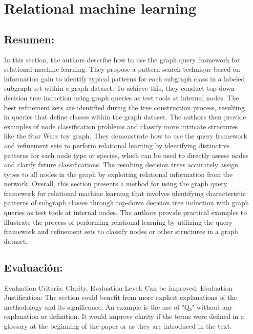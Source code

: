 \documentclass{article}%
\begin{document}
%
\clearpage%
\section{Relational machine learning}%
\label{sec:Relationalmachinelearning}%
\subsection{Resumen:}%
\label{subsec:Resumen}%
In this section, the authors describe how to use the graph query framework for relational machine learning. They propose a pattern search technique based on information gain to identify typical patterns for each subgraph class in a labeled subgraph set within a graph dataset. To achieve this, they conduct top{-}down decision tree induction using graph queries as test tools at internal nodes. The best refinement sets are identified during the tree construction process, resulting in queries that define classes within the graph dataset.\newline%
\newline%
The authors then provide examples of node classification problems and classify more intricate structures like the Star Wars toy graph. They demonstrate how to use the query framework and refinement sets to perform relational learning by identifying distinctive patterns for each node type or species, which can be used to directly assess nodes and clarify future classifications. The resulting decision trees accurately assign types to all nodes in the graph by exploiting relational information from the network.\newline%
\newline%
Overall, this section presents a method for using the graph query framework for relational machine learning that involves identifying characteristic patterns of subgraph classes through top{-}down decision tree induction with graph queries as test tools at internal nodes. The authors provide practical examples to illustrate the process of performing relational learning by utilizing the query framework and refinement sets to classify nodes or other structures in a graph dataset.

%
\subsection{Evaluación:}%
\label{subsec:Evaluacin}%
\newline%
Evaluation Criteria: Clarity, Evaluation Level: Can be improved, Evaluation Justification: The section could benefit from more explicit explanations of the methodology and its significance. An example is the use of "Q₀" without any explanation or definition. It would improve clarity if the terms were defined in a glossary at the beginning of the paper or as they are introduced in the text.
\end{document}
